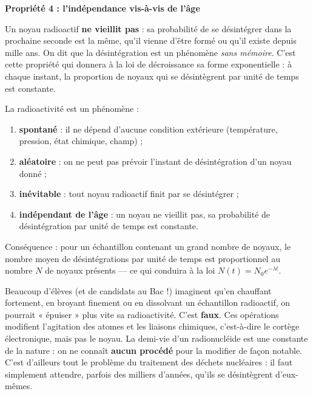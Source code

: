 \documentclass[11pt]{article}
\begin{document}
\textbf{Propriété 4 : l'indépendance vis-à-vis de l'âge}\par
Un noyau radioactif \textbf{ne vieillit pas} : sa probabilité de se désintégrer dans la prochaine seconde est la même, qu'il vienne d'être formé ou qu'il existe depuis mille ans. On dit que la désintégration est un phénomène \emph{sans mémoire}. C'est cette propriété qui donnera à la loi de décroissance sa forme exponentielle : à chaque instant, la proportion de noyaux qui se désintègrent par unité de temps est constante.

\begin{propriete}
La radioactivité est un phénomène :
\begin{enumerate}
\item \textbf{spontané} : il ne dépend d'aucune condition extérieure (température, pression, état chimique, champ) ;
\item \textbf{aléatoire} : on ne peut pas prévoir l'instant de désintégration d'un noyau donné ;
\item \textbf{inévitable} : tout noyau radioactif finit par se désintégrer ;
\item \textbf{indépendant de l'âge} : un noyau ne vieillit pas, sa probabilité de désintégration par unité de temps est constante.
\end{enumerate}
Conséquence : pour un échantillon contenant un grand nombre de noyaux, le nombre moyen de désintégrations par unité de temps est proportionnel au nombre $N$ de noyaux présents — ce qui conduira à la loi $N(t) = N_0 e^{-\lambda t}$.
\end{propriete}

\begin{attention}
Beaucoup d'élèves (et de candidats au Bac !) imaginent qu'en chauffant fortement, en broyant finement ou en dissolvant un échantillon radioactif, on pourrait « épuiser » plus vite sa radioactivité. C'est \textbf{faux}. Ces opérations modifient l'agitation des atomes et les liaisons chimiques, c'est-à-dire le cortège électronique, mais pas le noyau. La demi-vie d'un radionucléide est une constante de la nature : on ne connaît \textbf{aucun procédé} pour la modifier de façon notable. C'est d'ailleurs tout le problème du traitement des déchets nucléaires : il faut simplement attendre, parfois des milliers d'années, qu'ils se désintègrent d'eux-mêmes.
\end{attention}
\end{document}
